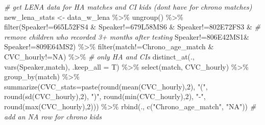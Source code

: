 \documentclass[
]{article}
\newenvironment{Shaded}{\begin{snugshade}}{\end{snugshade}}
\newcommand{\AttributeTok}[1]{\textcolor[rgb]{0.77,0.63,0.00}{#1}}
\newcommand{\CommentTok}[1]{\textcolor[rgb]{0.56,0.35,0.01}{\textit{#1}}}
\newcommand{\DecValTok}[1]{\textcolor[rgb]{0.00,0.00,0.81}{#1}}
\newcommand{\FunctionTok}[1]{\textcolor[rgb]{0.00,0.00,0.00}{#1}}
\newcommand{\NormalTok}[1]{#1}
\newcommand{\OtherTok}[1]{\textcolor[rgb]{0.56,0.35,0.01}{#1}}
\newcommand{\SpecialCharTok}[1]{\textcolor[rgb]{0.00,0.00,0.00}{#1}}
\newcommand{\StringTok}[1]{\textcolor[rgb]{0.31,0.60,0.02}{#1}}
\begin{document}
\begin{Shaded}
\begin{Highlighting}[]
\CommentTok{\# get LENA data for HA matches and CI kids (don\textquotesingle{}t have for chrono matches)}
\NormalTok{new\_lena\_stats }\OtherTok{\textless{}{-}}\NormalTok{ data\_w\_lena }\SpecialCharTok{\%\textgreater{}\%}
  \FunctionTok{ungroup}\NormalTok{() }\SpecialCharTok{\%\textgreater{}\%}
  \FunctionTok{filter}\NormalTok{(Speaker}\SpecialCharTok{!=}\StringTok{\textquotesingle{}665L52FS4\textquotesingle{}} \SpecialCharTok{\&}\NormalTok{ Speaker}\SpecialCharTok{!=}\StringTok{\textquotesingle{}679L58MS6\textquotesingle{}} \SpecialCharTok{\&}\NormalTok{ Speaker}\SpecialCharTok{!=}\StringTok{\textquotesingle{}802E72FS3\textquotesingle{}} \SpecialCharTok{\&} \CommentTok{\# remove children who recorded 3+ months after testing}
\NormalTok{           Speaker}\SpecialCharTok{!=}\StringTok{\textquotesingle{}806E42MS1\textquotesingle{}}\SpecialCharTok{\&}\NormalTok{ Speaker}\SpecialCharTok{!=}\StringTok{\textquotesingle{}809E64MS2\textquotesingle{}}\NormalTok{) }\SpecialCharTok{\%\textgreater{}\%}
  \FunctionTok{filter}\NormalTok{(match}\SpecialCharTok{!=}\StringTok{\textquotesingle{}Chrono\_age\_match\textquotesingle{}} \SpecialCharTok{\&}\NormalTok{ CVC\_hourly}\SpecialCharTok{!=}\StringTok{\textquotesingle{}NA\textquotesingle{}}\NormalTok{) }\SpecialCharTok{\%\textgreater{}\%} \CommentTok{\# only HA and CIs}
  \FunctionTok{distinct\_at}\NormalTok{(., }\FunctionTok{vars}\NormalTok{(Speaker,match), }\AttributeTok{.keep\_all =}\NormalTok{ T) }\SpecialCharTok{\%\textgreater{}\%}
  \FunctionTok{select}\NormalTok{(match, CVC\_hourly) }\SpecialCharTok{\%\textgreater{}\%}
  \FunctionTok{group\_by}\NormalTok{(match) }\SpecialCharTok{\%\textgreater{}\%}
  \FunctionTok{summarize}\NormalTok{(}\AttributeTok{CVC\_stats=}\FunctionTok{paste}\NormalTok{(}\FunctionTok{round}\NormalTok{(}\FunctionTok{mean}\NormalTok{(CVC\_hourly),}\DecValTok{2}\NormalTok{),}
                            \StringTok{"("}\NormalTok{,}
                            \FunctionTok{round}\NormalTok{(}\FunctionTok{sd}\NormalTok{(CVC\_hourly),}\DecValTok{2}\NormalTok{),}
                            \StringTok{")"}\NormalTok{,}
                            \FunctionTok{round}\NormalTok{(}\FunctionTok{min}\NormalTok{(CVC\_hourly),}\DecValTok{2}\NormalTok{),}
                            \StringTok{"{-}"}\NormalTok{,}
                            \FunctionTok{round}\NormalTok{(}\FunctionTok{max}\NormalTok{(CVC\_hourly),}\DecValTok{2}\NormalTok{))) }\SpecialCharTok{\%\textgreater{}\%}
  \FunctionTok{rbind}\NormalTok{(., }\FunctionTok{c}\NormalTok{(}\StringTok{"Chrono\_age\_match"}\NormalTok{, }\StringTok{"NA"}\NormalTok{)) }\CommentTok{\#  add an NA row for chrono kids}




\end{Highlighting}
\end{Shaded}
\end{document}
